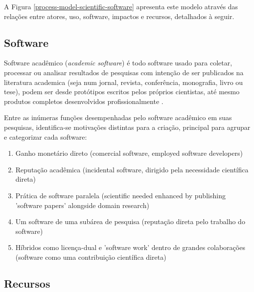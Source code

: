 A Figura \ref{process-model-scientific-software} apresenta este modelo através
das relações entre atores, uso, software, impactos e recursos, detalhados à
seguir.

\subsection{Software}

Software acadêmico ({\it academic software}) é todo software usado para
coletar, processar ou analisar resultados de pesquisas com intenção de ser
publicados na literatura academica (seja num jornal, revista, conferência,
monografia, livro ou tese), podem ser desde protótipos escritos pelos próprios
cientistas, até mesmo produtos completos desenvolvidos profissionalmente
\cite{allen2017engineering}.


Entre as inúmeras funções desempenhadas pelo software acadêmico em suas
pesquisas, identifica-se motivações distintas para a criação, principal
para agrupar e categorizar cada software:

\begin{enumerate}
  \item Ganho monetário direto (comercial software, employed software developers)
  \item Reputação acadêmica (incidental software, dirigido pela necessidade científica direta)
  \item Prática de software paralela (scientific needed enhanced by publishing 'software papers' alongside domain research)
  \item Um software de uma subárea de pesquisa (reputação direta pelo trabalho do software)
  \item Híbridos como licença-dual e 'software work' dentro de grandes colaborações (software como uma contribuição científica direta)
\end{enumerate}

\subsection{Recursos}

